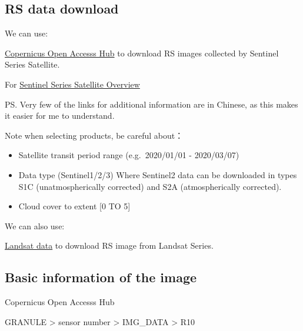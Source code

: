 \documentclass[
  letterpaper,
  DIV=11,
  numbers=noendperiod]{scrreprt}
\providecommand{\tightlist}{%
  \setlength{\itemsep}{0pt}\setlength{\parskip}{0pt}}\usepackage{longtable,booktabs,array}
\begin{document}
\hypertarget{rs-data-download}{%
\subsection{RS data download}\label{rs-data-download}}

We can use:

\href{https://scihub.copernicus.eu/dhus/\#/home}{Copernicus Open Accesss
Hub} to download RS images collected by Sentinel Series Satellite.

\begin{tcolorbox}[enhanced jigsaw, title=\textcolor{quarto-callout-note-color}{\faInfo}\hspace{0.5em}{Note}, coltitle=black, opacitybacktitle=0.6, toprule=.15mm, leftrule=.75mm, opacityback=0, arc=.35mm, breakable, colbacktitle=quarto-callout-note-color!10!white, colback=white, bottomrule=.15mm, bottomtitle=1mm, toptitle=1mm, titlerule=0mm, rightrule=.15mm, left=2mm, colframe=quarto-callout-note-color-frame]
For \href{https://zhuanlan.zhihu.com/p/356726375}{Sentinel Series
Satellite Overview}

PS. Very few of the links for additional information are in Chinese, as
this makes it easier for me to understand.
\end{tcolorbox}

Note when selecting products, be careful about：

\begin{itemize}
\tightlist
\item
  Satellite transit period range (e.g.~2020/01/01 - 2020/03/07)
\item
  Data type (Sentinel1/2/3) Where Sentinel2 data can be downloaded in
  types S1C (unatmospherically corrected) and S2A (atmospherically
  corrected).
\item
  Cloud cover to extent {[}0 TO 5{]}
\end{itemize}

We can also use:

\href{https://earthexplorer.usgs.gov/.}{Landsat data} to download RS
image from Landsat Series.

\hypertarget{basic-information-of-the-image}{%
\subsection{Basic information of the
image}\label{basic-information-of-the-image}}

Copernicus Open Accesss Hub

GRANULE \textgreater{} sensor number \textgreater{} IMG\_DATA
\textgreater{} R10
\end{document}
